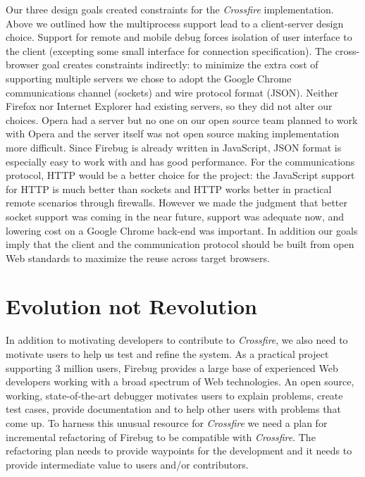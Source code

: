 Our three design goals created constraints for the \textit{Crossfire}
implementation. Above we outlined how the multiprocess support lead to a
client-server design choice. Support for remote and mobile debug forces
isolation of user interface to the client (excepting some small interface for
connection specification). The cross-browser goal creates constraints
indirectly: to minimize the extra cost of supporting multiple servers we chose
to adopt the Google Chrome communications channel (sockets) and wire protocol
format (JSON). Neither Firefox nor Internet Explorer had existing servers, so
they did not alter our choices. Opera had a server but no one on our open source
team planned to work with Opera and the server itself was not open source making
implementation more difficult.  Since Firebug is already written in JavaScript,
JSON format is especially easy to work with and has good performance\cite{json}.
 For the communications protocol, HTTP would be a better choice for the project:
the JavaScript support for HTTP is much better than sockets and HTTP works
better in practical remote scenarios through firewalls.  However we made the
judgment that better socket support was coming in the near
future\cite{websocketapi}, support was adequate now, and lowering cost on a
Google Chrome back-end was important.  In addition our goals imply that the
client and the communication protocol should be built from open Web standards to
maximize the reuse across target browsers.


\section{Evolution not Revolution}
In addition to motivating developers to contribute to \textit{Crossfire}, we
also need to motivate users to help us test and refine the system. As a
practical project supporting 3 million users, Firebug provides a large base of
experienced Web developers working with a broad spectrum of Web technologies. An
open source, working, state-of-the-art debugger motivates users to explain
problems, create test cases, provide documentation and to help other users with
problems that come up. To harness this
 unusual resource  for \textit{Crossfire} we need a plan for incremental
 refactoring of Firebug to be compatible
with \textit{Crossfire}.  The refactoring plan needs to provide waypoints for
the development and it needs to provide intermediate value to users and/or
contributors.


